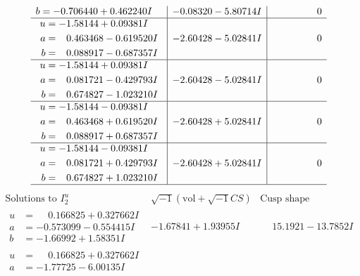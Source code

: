\documentclass[1p]{elsarticle_modified}
\theoremstyle{definition}
\newcommand{\I}{\sqrt{-1}}
\begin{document}
$$\begin{array}{c|c|c}
\begin{aligned}
b &= -0.706440 + 0.462240 I\end{aligned}
 & -0.08320 - 5.80714 I & \phantom{-0.000000 } 0 \\ \hline\begin{aligned}
u &= -1.58144 + 0.09381 I \\
a &= \phantom{-}0.463468 - 0.619520 I \\
b &= \phantom{-}0.088917 - 0.687357 I\end{aligned}
 & -2.60428 - 5.02841 I & \phantom{-0.000000 } 0 \\ \hline\begin{aligned}
u &= -1.58144 + 0.09381 I \\
a &= \phantom{-}0.081721 - 0.429793 I \\
b &= \phantom{-}0.674827 - 1.023210 I\end{aligned}
 & -2.60428 - 5.02841 I & \phantom{-0.000000 } 0 \\ \hline\begin{aligned}
u &= -1.58144 - 0.09381 I \\
a &= \phantom{-}0.463468 + 0.619520 I \\
b &= \phantom{-}0.088917 + 0.687357 I\end{aligned}
 & -2.60428 + 5.02841 I & \phantom{-0.000000 } 0 \\ \hline\begin{aligned}
u &= -1.58144 - 0.09381 I \\
a &= \phantom{-}0.081721 + 0.429793 I \\
b &= \phantom{-}0.674827 + 1.023210 I\end{aligned}
 & -2.60428 + 5.02841 I & \phantom{-0.000000 } 0\\
 \hline 
 \end{array}$$\newpage$$\begin{array}{c|c|c}  
\text{Solutions to }I^u_{2}& \I (\text{vol} + \sqrt{-1}CS) & \text{Cusp shape}\\
 \hline 
\begin{aligned}
u &= \phantom{-}0.166825 + 0.327662 I \\
a &= -0.573099 - 0.554415 I \\
b &= -1.66992 + 1.58351 I\end{aligned}
 & -1.67841 + 1.93955 I & \phantom{-}15.1921 - 13.7852 I \\ \hline\begin{aligned}
u &= \phantom{-}0.166825 + 0.327662 I \\
a &= -1.77725 - 6.00135 I \\

\end{aligned}
\end{array}$$
\end{document}
